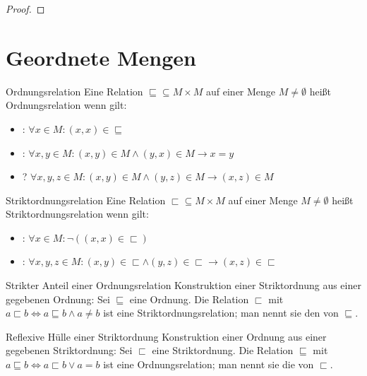\documentclass{paper}
\begin{document}
\begin{proof}
\end{proof}


\section{Geordnete Mengen}

\begin{definition}{Ordnungsrelation}
Eine Relation $⊑ ⊆ M × M$ auf einer Menge $M ≠ ∅$ heißt Ordnungsrelation
wenn gilt:
\begin{itemize}
\item {}: $∀ x ∈ M: (x,x) ∈ ⊑$
\item {}: $∀ x, y ∈ M: (x,y) ∈ M ∧ (y,x) ∈ M → x = y$
\item {}? $∀ x, y, z ∈ M: (x,y) ∈ M ∧ (y,z) ∈ M → (x,z) ∈ M$
\end{itemize}
\end{definition}

\begin{definition}{Striktordnungsrelation}
Eine Relation $⊏ ⊆ M × M$ auf einer Menge $M ≠ ∅$ heißt Striktordnungsrelation
wenn gilt:
\begin{itemize}
\item {}: $∀ x ∈ M: ¬((x,x) ∈ ⊏)$
\item {}: $∀ x, y ,z ∈ M: (x,y) ∈ ⊏ ∧ (y,z) ∈ ⊏ → (x,z) ∈ ⊏$
\end{itemize}
\end{definition}

\begin{definition}{Strikter Anteil einer Ordnungsrelation}
Konstruktion einer Striktordnung aus einer gegebenen Ordnung:
Sei $⊑$ eine Ordnung. Die Relation $⊏$ mit
$a ⊏ b ⇔ a ⊑ b ∧ a ≠ b$ ist eine Striktordnungsrelation;
man nennt sie den  von $⊑$.
\end{definition}

\begin{definition}{Reflexive Hülle einer Striktordnung}
Konstruktion einer Ordnung aus einer gegebenen Striktordnung:
Sei $⊏$ eine Striktordnung. Die Relation $⊑$ mit 
$a ⊑ b ⇔ a ⊏ b ∨ a = b$ ist eine Ordnungsrelation;
man nennt sie die  von $⊏$.
\end{definition}
\end{document}
